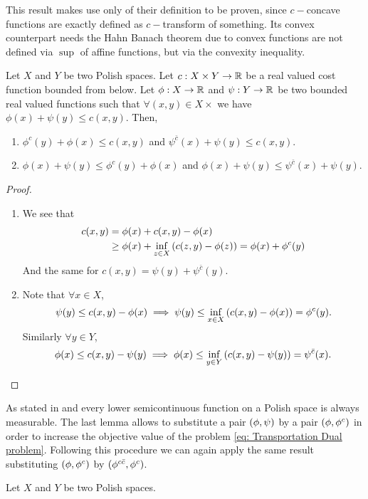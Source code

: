 This result makes use only of their definition to be proven, since $c-$concave functions are exactly defined as $c-$transform
of something. Its convex counterpart needs the Hahn Banach theorem due to convex functions are not defined via $\sup$ of affine functions, but via the
convexity inequality. 


\begin{lemma}
	Let $X$ and $Y$ be two Polish spaces. Let $c:X\times Y \rightarrow \mathbb{R}$ be a real valued cost function bounded from below. Let $\phi:X\rightarrow \mathbb{R}$ and $\psi:Y\rightarrow\mathbb{R}$ be two bounded real valued functions such that $\forall (x,y)\in X\times$ we have $\phi(x)+\psi(y)\leq c(x,y)$. Then, 
	\begin{enumerate}
		\item $\phi^c(y)+\phi(x)\leq c(x,y)$ and $\psi^{\bar c}(x)+\psi(y)\leq c(x,y)$. 
		\item $\phi(x)+\psi(y)\leq\phi^c(y)+\phi(x) $ and $\phi(x)+\psi(y)\leq\psi^{\bar c}(x)+\psi(y)$.
	\end{enumerate}
\end{lemma}

\begin{proof}

\begin{enumerate}
\item  We see that 
\begin{align*}
c(x,y)&=\phi(x)+c(x,y)-\phi(x)\\
		&\geq\phi(x)+\inf_{z\in X} \left( c(z,y)-\phi(z) \right)=\phi(x)+\phi^c(y)
\end{align*}
And the same for $c(x,y)=\psi(y)+\psi^{\bar c}(y)$.

\item  Note that $\forall x\in X$,
\begin{equation*}
\psi(y)\leq c(x,y)-\phi(x)\implies\psi(y)\leq \inf_{x\in X}\left( c(x,y)-\phi(x) \right)=\phi^c(y). 
\end{equation*}	
Similarly $\forall y \in Y$,
\begin{equation*}
\phi(x)\leq c(x,y)-\psi(y)\implies\phi(x)\leq\inf_{y\in Y}\left( c(x,y)-\psi(y) \right)=\psi^{\bar{c}}(x).
\end{equation*}	
\end{enumerate}	
	
\end{proof}
As stated in \cite{Villani2008} and every lower semicontinuous function on a Polish space is always measurable. The last lemma allows to substitute a pair $\left( \phi, \psi \right)$ by a pair $\left( \phi,\phi^c \right)$ in order to increase the objective value of the problem \eqref{eq: Transportation Dual problem}. Following this procedure we can again apply the same result substituting $\left( \phi,\phi^c \right)$ by $\left( \phi^{c\bar c}, \phi^c \right)$.  \\
\begin{lemma}
	Let $X$ and $Y$ be two Polish spaces. 
\end{lemma}
\begin{theorem}
	
\end{theorem}

